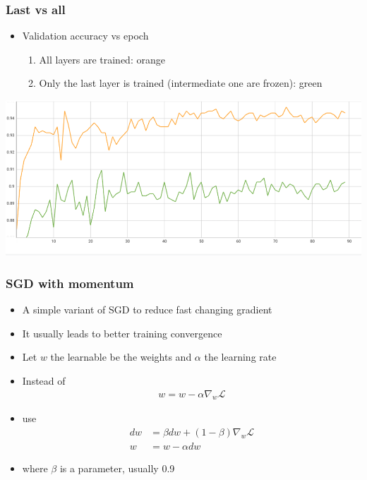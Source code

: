 \documentclass{beamer}
\begin{document}
\begin{frame}
    \frametitle{Last vs all}
\begin{itemize}
    \item Validation accuracy vs epoch
    \begin{enumerate}
        \item All layers are trained: orange
        \item Only the last layer is trained (intermediate one are frozen): green
    \end{enumerate}
\end{itemize}
    \includegraphics[width=\textwidth]{figs/last-vs-all.png}

\end{frame}

\begin{frame}
    \frametitle{SGD with momentum}

    \begin{itemize}
        \item A simple variant of SGD to reduce fast changing gradient
        \item It usually leads to better training convergence
        \item Let $w$ the learnable  be the weights and $\alpha$ the learning rate
        \item Instead of 
        \begin{align*}
            w=w-\alpha \nabla_w\mathcal{L}
        \end{align*}
\item use         
\begin{align*}
    dw&=\beta dw+(1-\beta)\nabla_w\mathcal{L}\\
    w&=w-\alpha dw
\end{align*}
\item where $\beta$ is a parameter, usually 0.9
    \end{itemize}
\end{frame}
\end{document}
